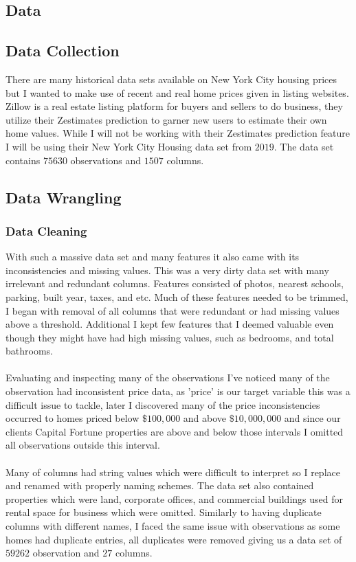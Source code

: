 \documentclass{article}
\begin{document}
\begin{titlepage}
\section{Data}
\subsection{Data Collection}
    There are many historical data sets available on New York City housing prices but I wanted to make use of recent and real home prices given in listing websites. Zillow is a real estate listing platform for buyers and sellers to do business, they utilize their Zestimates prediction to garner new users to estimate their own home values. While I will not be working with their Zestimates prediction feature I will be using their New York City Housing data set from $2019$. The data set contains $75630$ observations and $1507$ columns.

\subsection{Data Wrangling}
\subsubsection{Data Cleaning}
    With such a massive data set and many features it also came with its inconsistencies and missing values. This was a very dirty data set with many irrelevant and redundant columns. Features consisted of photos, nearest schools, parking, built year, taxes, and etc. Much of these features needed to be trimmed, I began with removal of all columns that were redundant or had missing values above a threshold. Additional I kept few features that I deemed valuable even though they might have had high missing values, such as bedrooms, and total bathrooms. \\
    \\
    Evaluating and inspecting many of the observations I've noticed many of the observation had inconsistent price data, as 'price' is our target variable this was a difficult issue to tackle, later I discovered many of the price inconsistencies occurred to homes priced below $\$100,000$ and above $\$10,000,000$ and since our clients Capital Fortune properties are above and below those intervals I omitted all observations outside this interval. \\
    \\
    Many of columns had string values which were difficult to interpret so I replace and renamed with properly naming schemes. The data set also contained properties which were land, corporate offices, and commercial buildings used for rental space for business which were omitted. Similarly to having duplicate columns with different names, I faced the same issue with observations as some homes had duplicate entries, all duplicates were removed giving us a data set of $59262$ observation and $27$ columns.

\end{titlepage}
\end{document}
